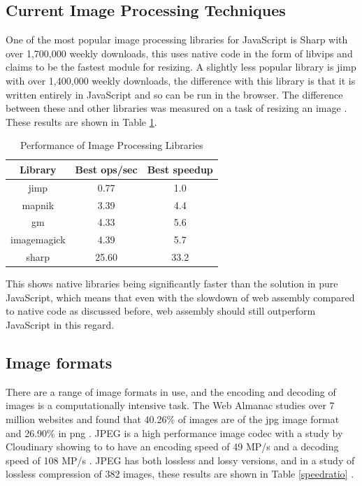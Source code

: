 \documentclass[12pt,a4paper]{article}
\begin{document}
\subsection{Current Image Processing Techniques}

One of the most popular image processing libraries for JavaScript is Sharp with over 1,700,000 weekly downloads, this uses native code in the form of libvips and claims to be the fastest module for resizing. A slightly less popular library is jimp with over 1,400,000 weekly downloads, the difference with this library is that it is written entirely in JavaScript and so can be run in the browser. The difference between these and other libraries was measured on a task of resizing an image \cite{sharp}. These results are shown in Table \ref{imgproc}.

\begin{table}[htb]
    \centering
    \caption{Performance of Image Processing Libraries}
    \vspace*{6pt}
    \label{imgproc}
    \begin{tabular}{ccc}\hline\hline
        Library     & Best ops/sec & Best speedup \\ \hline
        jimp        & 0.77         & 1.0          \\
        mapnik      & 3.39         & 4.4          \\
        gm          & 4.33         & 5.6          \\
        imagemagick & 4.39         & 5.7          \\
        sharp       & 25.60        & 33.2
    \end{tabular}
\end{table}


This shows native libraries being significantly faster than the solution in pure JavaScript, which means that even with the slowdown of web assembly compared to native code as discussed before, web assembly should still outperform JavaScript in this regard.

\subsection{Image formats}

There are a range of image formats in use, and the encoding and decoding of images is a computationally intensive task. The Web Almanac studies over 7 million websites and found that 40.26\% of images are of the jpg image format and 26.90\% in png \cite{webalmanac}. JPEG is a high performance image codec with a study by Cloudinary showing to to have an encoding speed of 49 MP/s and a decoding speed of 108 MP/s \cite{cloudinary}. JPEG has both lossless and lossy versions, and in a study of lossless compression of 382 images, these results are shown in Table \ref{speedratio} \cite{ukrit2011survey}.
\end{document}
